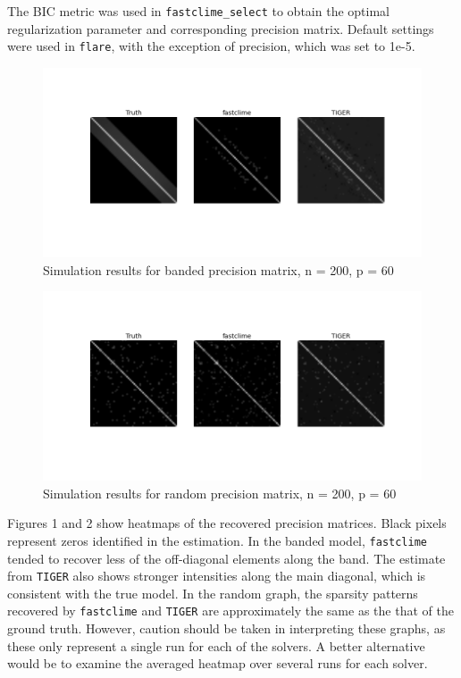 \documentclass{article}
\begin{document}
The BIC metric was used in \texttt{fastclime\_select} to obtain the
optimal regularization parameter and corresponding precision matrix.
Default settings were used in \texttt{flare}, with the exception of
precision, which was set to 1e-5.

    
\begin{figure}[!H]
\includegraphics[width=\linewidth]{banded.png}
\caption {Simulation results for banded precision matrix, n = 200, p = 60}
\label{fig:banded}
\end{figure}

\begin{figure}[!H]
\includegraphics[width=\linewidth]{random.png}
\caption {Simulation results for random precision matrix, n = 200, p = 60}
\label{fig:random}
\end{figure}     

    Figures 1 and 2 show heatmaps of the recovered precision matrices. Black
pixels represent zeros identified in the estimation. In the banded
model, \texttt{fastclime} tended to recover less of the off-diagonal
elements along the band. The estimate from \texttt{TIGER} also shows
stronger intensities along the main diagonal, which is consistent with
the true model. In the random graph, the sparsity patterns recovered by
\texttt{fastclime} and \texttt{TIGER} are approximately the same as the
that of the ground truth. However, caution should be taken in
interpreting these graphs, as these only represent a single run for each
of the solvers. A better alternative would be to examine the averaged
heatmap over several runs for each solver.
\end{document}
